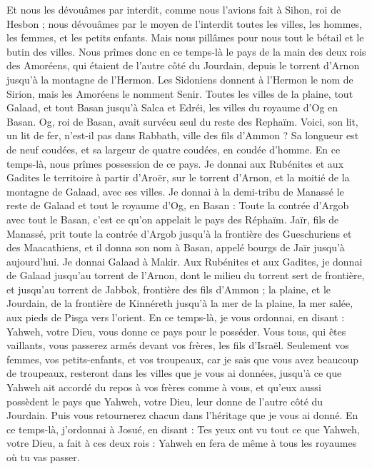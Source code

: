 \begin{multicols}{2}
Et nous les dévouâmes par interdit, comme nous l’avions fait à Sihon, roi de Hesbon ; nous dévouâmes par le moyen de l'interdit toutes les villes, les hommes, les femmes, et les petits enfants.
Mais nous pillâmes pour nous tout le bétail et le butin des villes.
Nous prîmes donc en ce temps-là le pays de la main des deux rois des Amoréens, qui étaient de l’autre côté du Jourdain, depuis le torrent d'Arnon jusqu'à la montagne de l'Hermon.
Les Sidoniens donnent à l’Hermon le nom de Sirion, mais les Amoréens le nomment Senir.
Toutes les villes de la plaine, tout Galaad, et tout Basan jusqu'à Salca et Edréi, les villes du royaume d’Og en Basan.
Og, roi de Basan, avait survécu seul du reste des Rephaïm. Voici, son lit, un lit de fer, n'est-il pas dans Rabbath, ville des fils d’Ammon ? Sa longueur est de neuf coudées, et sa largeur de quatre coudées, en coudée d'homme.
En ce temps-là, nous prîmes possession de ce pays. Je donnai aux Rubénites et aux Gadites le territoire à partir d’Aroër, sur le torrent d'Arnon, et la moitié de la montagne de Galaad, avec ses villes.
Je donnai à la demi-tribu de Manassé le reste de Galaad et tout le royaume d’Og, en Basan : Toute la contrée d'Argob avec tout le Basan, c’est ce qu’on appelait le pays des Réphaïm.
Jaïr, fils de Manassé, prit toute la contrée d'Argob jusqu'à la frontière des Gueschuriens et des Maacathiens, et il donna son nom à Basan, appelé bourgs de Jaïr jusqu'à aujourd'hui.
Je donnai Galaad à Makir.
Aux Rubénites et aux Gadites, je donnai de Galaad jusqu'au torrent de l'Arnon, dont le milieu du torrent sert de frontière, et jusqu'au torrent de Jabbok, frontière des fils d’Ammon ;
la plaine, et le Jourdain, de la frontière de Kinnéreth jusqu'à la mer de la plaine, la mer salée, aux pieds de Pisga vers l'orient.
En ce temps-là, je vous ordonnai, en disant : Yahweh, votre Dieu, vous donne ce pays pour le posséder. Vous tous, qui êtes vaillants, vous passerez armés devant vos frères, les fils d'Israël.
Seulement vos femmes, vos petits-enfants, et vos troupeaux, car je sais que vous avez beaucoup de troupeaux, resteront dans les villes que je vous ai données,
jusqu'à ce que Yahweh ait accordé du repos à vos frères comme à vous, et qu'eux aussi possèdent le pays que Yahweh, votre Dieu, leur donne de l’autre côté du Jourdain. Puis vous retournerez chacun dans l’héritage que je vous ai donné.
En ce temps-là, j’ordonnai à Josué, en disant : Tes yeux ont vu tout ce que Yahweh, votre Dieu, a fait à ces deux rois : Yahweh en fera de même à tous les royaumes où tu vas passer.

\end{multicols}
